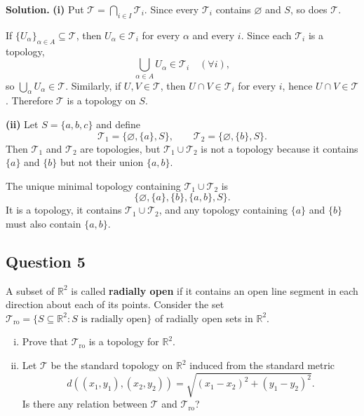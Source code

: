 \documentclass{article}
\newcommand{\R}{\mathbb{R}}
\newenvironment{solution}{\par\noindent\textbf{Solution.}\quad}{\par}
\begin{document}
\begin{solution}
\textbf{(i)} Put $\mathcal T=\bigcap_{i\in I}\mathcal T_i$. Since every
$\mathcal T_i$ contains $\varnothing$ and $S$, so does $\mathcal T$.

If $\{U_\alpha\}_{\alpha\in A}\subseteq\mathcal T$, then
$U_\alpha\in\mathcal T_i$ for every $\alpha$ and every $i$. Since each
$\mathcal T_i$ is a topology,
\[
  \bigcup_{\alpha\in A}U_\alpha\in\mathcal T_i
  \quad(\forall i),
\]
so $\bigcup_\alpha U_\alpha\in\mathcal T$. Similarly, if
$U,V\in\mathcal T$, then $U\cap V\in\mathcal T_i$ for every $i$, hence
$U\cap V\in\mathcal T$. Therefore $\mathcal T$ is a topology on $S$.

\textbf{(ii)} Let $S=\{a,b,c\}$ and define
\[
  \mathcal T_1=\{\varnothing,\{a\},S\},\qquad
  \mathcal T_2=\{\varnothing,\{b\},S\}.
\]
Then $\mathcal T_1$ and $\mathcal T_2$ are topologies, but
$\mathcal T_1\cup\mathcal T_2$ is not a topology because it contains
$\{a\}$ and $\{b\}$ but not their union $\{a,b\}$.

The unique minimal topology containing $\mathcal T_1\cup\mathcal T_2$ is
\[
  \{\varnothing,\{a\},\{b\},\{a,b\},S\}.
\]
It is a topology, it contains $\mathcal T_1\cup\mathcal T_2$, and any
topology containing $\{a\}$ and $\{b\}$ must also contain
$\{a,b\}$.
\end{solution}

\subsection{Question 5}
A subset of $\R^2$ is called \textbf{radially open} if it contains an open line segment in each direction about each of its points. Consider the set $\mathcal{T}_{\mathrm{ro}} = \{S \subseteq \R^2 : S \text{ is radially open}\}$ of radially open sets in $\R^2$.
\begin{enumerate}[(i)]
  \item Prove that $\mathcal{T}_{\mathrm{ro}}$ is a topology for $\R^2$.
  \item Let $\mathcal{T}$ be the standard topology on $\R^2$ induced from the standard metric
  \[
    d((x_1, y_1), (x_2, y_2))
    =\sqrt{(x_1 - x_2)^2 + (y_1 - y_2)^2}.
  \]
  Is there any relation between $\mathcal{T}$ and $\mathcal{T}_{\mathrm{ro}}$?
\end{enumerate}
\end{document}
